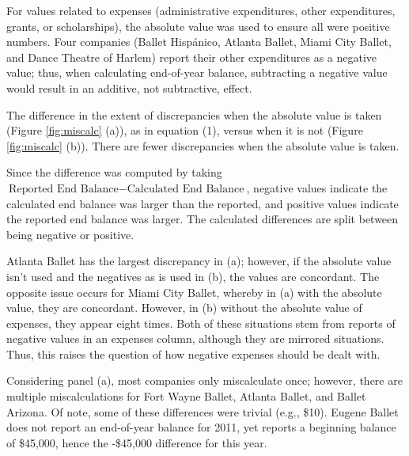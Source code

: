 \documentclass[Dance Data
Project,article,submit,moreauthors,pdftex]{mdpi}
\begin{document}
For values related to expenses (administrative expenditures, other
expenditures, grants, or scholarships), the absolute value was used to
ensure all were positive numbers. Four companies (Ballet Hispánico,
Atlanta Ballet, Miami City Ballet, and Dance Theatre of Harlem) report
their other expenditures as a negative value; thus, when calculating
end-of-year balance, subtracting a negative value would result in an
additive, not subtractive, effect.

The difference in the extent of discrepancies when the absolute value is
taken (Figure \ref{fig:miscalc} (a)), as in equation (1), versus when it
is not (Figure \ref{fig:miscalc} (b)). There are fewer discrepancies
when the absolute value is taken.

Since the difference was computed by taking
\(\text{Reported End Balance} - \text{Calculated End Balance}\),
negative values indicate the calculated end balance was larger than the
reported, and positive values indicate the reported end balance was
larger. The calculated differences are split between being negative or
positive.

Atlanta Ballet has the largest discrepancy in (a); however, if the
absolute value isn't used and the negatives as is used in (b), the
values are concordant. The opposite issue occurs for Miami City Ballet,
whereby in (a) with the absolute value, they are concordant. However, in
(b) without the absolute value of expenses, they appear eight times.
Both of these situations stem from reports of negative values in an
expenses column, although they are mirrored situations. Thus, this
raises the question of how negative expenses should be dealt with.

Considering panel (a), most companies only miscalculate once; however,
there are multiple miscalculations for Fort Wayne Ballet, Atlanta
Ballet, and Ballet Arizona. Of note, some of these differences were
trivial (e.g., \$10). Eugene Ballet does not report an end-of-year
balance for 2011, yet reports a beginning balance of \$45,000, hence the
-\$45,000 difference for this year.
\end{document}
